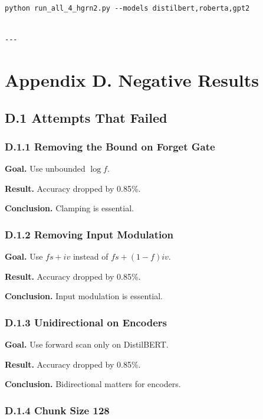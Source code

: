 \begin{lstlisting}
python run_all_4_hgrn2.py --models distilbert,roberta,gpt2
\end{lstlisting}
\begin{lstlisting}

---
\end{lstlisting}

\section{Appendix D. Negative Results}

\subsection{D.1 Attempts That Failed}

\subsubsection{D.1.1 Removing the Bound on Forget Gate}

\textbf{Goal.} Use unbounded $\log f$.

\textbf{Result.} Accuracy dropped by 0.85\%.

\textbf{Conclusion.} Clamping is essential.

\subsubsection{D.1.2 Removing Input Modulation}

\textbf{Goal.} Use $f s + i v$ instead of $f s + (1-f) i v$.

\textbf{Result.} Accuracy dropped by 0.85\%.

\textbf{Conclusion.} Input modulation is essential.

\subsubsection{D.1.3 Unidirectional on Encoders}

\textbf{Goal.} Use forward scan only on DistilBERT.

\textbf{Result.} Accuracy dropped by 0.85\%.

\textbf{Conclusion.} Bidirectional matters for encoders.

\subsubsection{D.1.4 Chunk Size 128}

